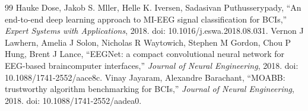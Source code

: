 \begin{thebibliography}{99}
 Hauke Dose, Jakob S. Mller, Helle K. Iversen, Sadasivan Puthusserypady, ``An end-to-end deep learning approach to MI-EEG signal classification for BCIs,'' \emph{Expert Systems with Applications}, 2018. doi: 10.1016/j.eswa.2018.08.031.
 Vernon J Lawhern, Amelia J Solon, Nicholas R Waytowich, Stephen M Gordon, Chou P Hung, Brent J Lance, ``EEGNet: a compact convolutional neural network for EEG-based braincomputer interfaces,'' \emph{Journal of Neural Engineering}, 2018. doi: 10.1088/1741-2552/aace8c.
 Vinay Jayaram, Alexandre Barachant, ``MOABB: trustworthy algorithm benchmarking for BCIs,'' \emph{Journal of Neural Engineering}, 2018. doi: 10.1088/1741-2552/aadea0.
\end{thebibliography}
